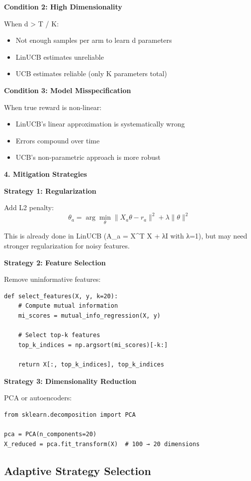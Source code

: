 \documentclass[12pt]{article}
\begin{document}
{{{\textbf{Condition 2: High Dimensionality}

When d > T / K:
\begin{itemize}
\item Not enough samples per arm to learn d parameters
\item LinUCB estimates unreliable
\item UCB estimates reliable (only K parameters total)
\end{itemize}

\textbf{Condition 3: Model Misspecification}

When true reward is non-linear:
\begin{itemize}
\item LinUCB's linear approximation is systematically wrong
\item Errors compound over time
\item UCB's non-parametric approach is more robust
\end{itemize}

\textbf{4. Mitigation Strategies}

\textbf{Strategy 1: Regularization}

Add L2 penalty:
\begin{equation}
\theta_a = \arg\min_\theta \|X_a \theta - r_a\|^2 + \lambda\|\theta\|^2
\end{equation}

This is already done in LinUCB (A_a = X^T X + λI with λ=1), but may need stronger regularization for noisy features.

\textbf{Strategy 2: Feature Selection}

Remove uninformative features:
\begin{verbatim}
def select_features(X, y, k=20):
    # Compute mutual information
    mi_scores = mutual_info_regression(X, y)

    # Select top-k features
    top_k_indices = np.argsort(mi_scores)[-k:]

    return X[:, top_k_indices], top_k_indices
\end{verbatim}

\textbf{Strategy 3: Dimensionality Reduction}

PCA or autoencoders:
\begin{verbatim}
from sklearn.decomposition import PCA

pca = PCA(n_components=20)
X_reduced = pca.fit_transform(X)  # 100 → 20 dimensions
\end{verbatim}

\subsection{Adaptive Strategy Selection}

}}}
\end{document}
